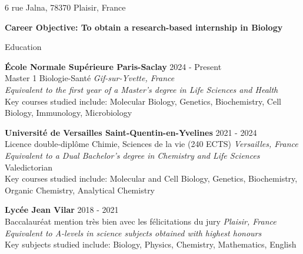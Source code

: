 \documentclass[
	10pt,
]{style} %
\begin{document}
\vspace{-0.25em}

\begin{center}
	6 rue Jalna, 78370 Plaisir, France \\
\end{center}

\begin{center}
	\textbf{Career Objective: To obtain a research-based internship in Biology}
\end{center}


\begin{rSection}{Education}

	\textbf{École Normale Supérieure Paris-Saclay} \hfill 2024 - Present \\
	Master 1 Biologie-Santé \hfill \textit{Gif-sur-Yvette, France} \\
	\textit{Equivalent to the first year of a Master's degree in Life Sciences and Health} \\
	Key courses studied include: Molecular Biology, Genetics, Biochemistry, Cell Biology, Immunology, Microbiology

	\vspace{0.5mm}

	\textbf{Université de Versailles Saint-Quentin-en-Yvelines} \hfill 2021 - 2024 \\
	Licence double-diplôme Chimie, Sciences de la vie (240 ECTS) \hfill \textit{Versailles, France} \\
	\textit{Equivalent to a Dual Bachelor's degree in Chemistry and Life Sciences} \\
	Valedictorian \\
	Key courses studied include: Molecular and Cell Biology, Genetics, Biochemistry, Organic Chemistry, Analytical Chemistry

	\vspace{0.5mm}

	\textbf{Lycée Jean Vilar} \hfill 2018 - 2021 \\
	Baccalauréat mention très bien avec les félicitations du jury \hfill \textit{Plaisir, France} \\
	\textit{Equivalent to A-levels in science subjects obtained with highest honours} \\
	Key subjects studied include: Biology, Physics, Chemistry, Mathematics, English

\end{rSection}
\end{document}
